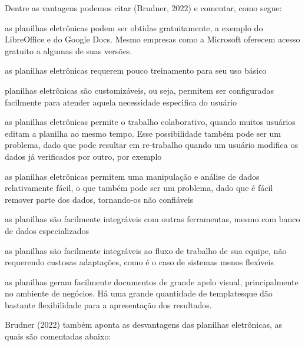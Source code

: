 \documentclass[
12pt,		%
openright,	%
twoside,  %
a4paper,			%
chapter=TITLE,		%
english,			%
french,				%
spanish,			%
brazil				%
]{USPSC-classe/USPSC}
\begin{document}
Dentre as vantagens podemos citar (Brudner, 2022) e comentar, como segue:



\begin{alineas}
\item as planilhas eletr\^onicas podem ser obtidas gratuitamente, a exemplo do LibreOffice e do Google Docs. Mesmo empresas como a Microsoft oferecem acesso gratuito a algumas de suas vers\~oes.
\item as planilhas eletr\^onicas requerem pouco treinamento para seu uso b\'asico
\item planilhas eletr\^onicas s\~ao \textquotedbl customiz\'aveis\textquotedbl , ou seja, permitem ser configuradas facilmente para atender aquela necessidade espec\'{\i}fica do usu\'ario
\item as planilhas eletr\^onicas permite o trabalho colaborativo, quando muitos usu\'arios editam a planilha ao mesmo tempo. Esse possibilidade tamb\'em pode ser um problema, dado que pode resultar em re-trabalho quando um usu\'ario modifica os dados j\'a verificados por outro, por exemplo
\item as planilhas eletr\^onicas permitem uma manipula\c{c}\~ao e an\'alise de dados relativamente f\'acil, o que tamb\'em pode ser um problema, dado que \'e f\'acil remover parte dos dados, tornando-os n\~ao confi\'aveis
\item as planilhas s\~ao facilmente integr\'aveis com outras  ferramentas, mesmo com banco de dados especializados
\item as planilhas s\~ao facilmente integr\'aveis ao fluxo de trabalho de sua equipe, n\~ao requerendo custosas adapta\c{c}\~oes, como \'e o caso de sistemas menos flex\'{\i}veis
\item as planilhas geram facilmente documentos de grande apelo visual, principalmente no ambiente de neg\'ocios. H\'a uma grande quantidade de \textquotedbl templates\textquotedbl  que d\~ao bastante flexibilidade para a apresenta\c{c}\~ao dos resultados.
\end{alineas}

 Brudner (2022) tamb\'em aponta as desvantagens das planilhas eletr\^onicas, as quais s\~ao comentadas abaixo:
\end{document}
